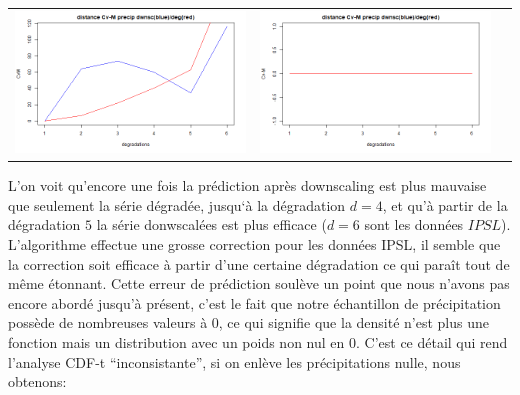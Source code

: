 \documentclass[a4paper,11pt]{article}
\begin{document}
\vspace{0.5cm}

\hspace{-1cm}
\begin{tabular}{ccc}
	\includegraphics[scale=0.4]{images/Dist_CVM_precip.png} & \includegraphics[scale=0.4]{images/Dist_CVM_evap.png}  \\
\end{tabular} 


L'on voit qu'encore une fois la prédiction après downscaling est plus mauvaise que seulement la série dégradée, jusqu`à la dégradation $d=4$, et qu'à partir de la dégradation $5$ la série donwscalées est plus efficace ($d=6$ sont les données $IPSL$). L'algorithme effectue une grosse correction pour les données IPSL, il semble que la correction soit efficace à partir d'une certaine dégradation ce qui paraît tout de même étonnant. Cette erreur de prédiction soulève un point que nous n'avons pas encore abordé jusqu'à présent, c'est le fait que notre échantillon de précipitation possède de nombreuses valeurs à $0$, ce qui signifie que la densité n'est plus une fonction mais un distribution avec un poids non nul en $0$. C'est ce détail qui rend l'analyse CDF-t ``inconsistante'', si on enlève les précipitations nulle, nous obtenons:
\end{document}
